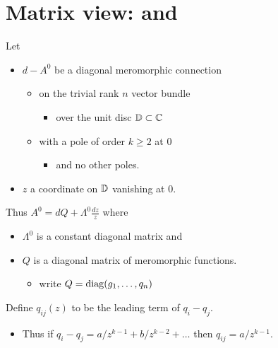 \section{Matrix view: \cite{boalch} and \cite{thboalch}} %
Let
\begin{itemize}
  \item $d-A^0$ be a diagonal meromorphic connection
    \begin{itemize}
      \item on the trivial rank $n$ vector bundle
        \begin{itemize}
          \item over the unit disc $\mathbb{D}\subset\mathbb{C}$
        \end{itemize}
      \item with a pole of order $k\geq2$ at $0$
        \begin{itemize}
          \item and no other poles.
        \end{itemize}
    \end{itemize}
  \item $z$ a coordinate on $\mathbb{D}$ vanishing at $0$.
\end{itemize}
Thus $A^0=dQ+\Lambda^0\frac{dz}{z}$ where
\begin{itemize}
  \item $\Lambda^0$ is a constant diagonal matrix and
  \item $Q$ is a diagonal matrix of meromorphic functions.
    \begin{itemize}
      \item write $Q=\operatorname{diag}(g_1,\dots,q_n)$
    \end{itemize}
\end{itemize}
Define $q_{ij}(z)$ to be the leading term of $q_i-q_j$.
\begin{itemize}
  \item Thus if $q_i-q_j=a/z^{k-1}+b/z^{k-2}+\dots$ then $q_{ij}=a/z^{k-1}$.
\end{itemize}
